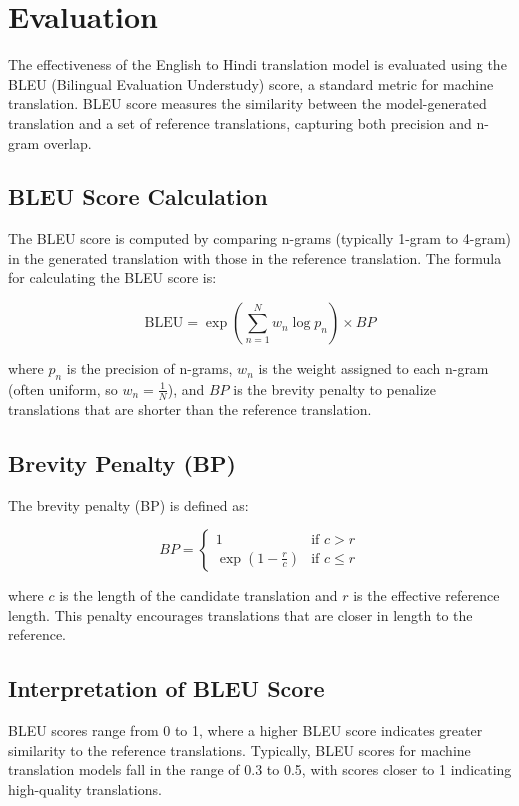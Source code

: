 \documentclass[12pt]{article}
\begin{document}
\section{Evaluation}
The effectiveness of the English to Hindi translation model is evaluated using the BLEU (Bilingual Evaluation Understudy) score, a standard metric for machine translation. BLEU score measures the similarity between the model-generated translation and a set of reference translations, capturing both precision and n-gram overlap.

\subsection{BLEU Score Calculation}
The BLEU score is computed by comparing n-grams (typically 1-gram to 4-gram) in the generated translation with those in the reference translation. The formula for calculating the BLEU score is:

\begin{equation}
\text{BLEU} = \exp \left( \sum_{n=1}^{N} w_n \log p_n \right) \times BP
\end{equation}

where \( p_n \) is the precision of n-grams, \( w_n \) is the weight assigned to each n-gram (often uniform, so \( w_n = \frac{1}{N} \)), and \( BP \) is the brevity penalty to penalize translations that are shorter than the reference translation.

\subsection{Brevity Penalty (BP)}
The brevity penalty (BP) is defined as:

\begin{equation}
BP = 
\begin{cases} 
1 & \text{if } c > r \\
\exp \left( 1 - \frac{r}{c} \right) & \text{if } c \leq r 
\end{cases}
\end{equation}

where \( c \) is the length of the candidate translation and \( r \) is the effective reference length. This penalty encourages translations that are closer in length to the reference.

\subsection{Interpretation of BLEU Score}
BLEU scores range from 0 to 1, where a higher BLEU score indicates greater similarity to the reference translations. Typically, BLEU scores for machine translation models fall in the range of 0.3 to 0.5, with scores closer to 1 indicating high-quality translations.
\end{document}
